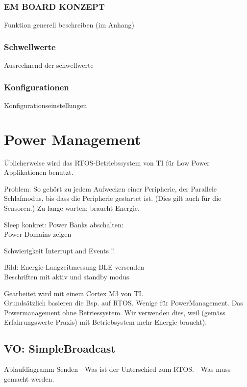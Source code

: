 \subsubsection*{EM BOARD KONZEPT}
Funktion generell beschreiben (im Anhang) 
\subsubsection*{Schwellwerte}
Ausrechnend der schwellwerte
\subsubsection*{Konfigurationen}
Konfigurationseinstellungen



\section{Power Management}
Üblicherweise wird das RTOS-Betriebssystem von TI für Low Power Applikationen benutzt. 


Problem: So gehört zu jedem Aufwecken einer Peripherie, der Parallele Schlafmodus, bis dass die Peripherie gestartet ist. (Dies gilt auch für die Sensoren.) Zu lange warten: braucht Energie.

Sleep konkret: Power Banks abschalten:\\
Power Domains zeigen

Schwierigkeit Interrupt and Events !!

Bild: Energie-Langzeitmessung BLE versenden\\
Beschriften mit aktiv und standby modus


Gearbeitet wird mit einem Cortex M3 von TI.\\ 
Grundsätzlich basieren die Bsp. auf RTOS. Wenige für PowerManagement. Das Powermanagement ohne Betriessystem. Wir verwenden dies, weil (gemäss Erfahrungswerte Praxis) mit Betriebsystem mehr Energie braucht).

\subsection{VO: SimpleBroadcast}

Ablaufdiagramm Senden
- Was ist der Unterschied zum RTOS.
- Was muss gemacht werden.


